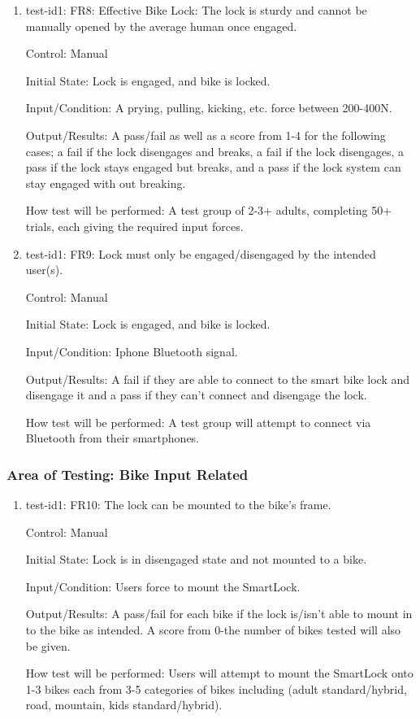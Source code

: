 \documentclass[12pt, titlepage]{article}
\begin{document}
\begin{enumerate}

\item{test-id1: FR8: Effective Bike Lock: The lock is sturdy and cannot be manually opened by the average human once engaged. \\}

Control: Manual

Initial State: Lock is engaged, and bike is locked.

Input/Condition: A prying, pulling, kicking, etc. force between 200-400N.

Output/Results: A pass/fail as well as a score from 1-4 for the following cases; a fail if the lock disengages and breaks, a fail if the lock disengages, a pass if the lock stays engaged but breaks, and a pass if the lock system can stay engaged with out breaking.

How test will be performed: A test group of 2-3+ adults, completing 50+ trials, each giving the required input forces.

\item{test-id1: FR9: Lock must only be engaged/disengaged by the intended user(s). \\}

Control: Manual

Initial State: Lock is engaged, and bike is locked.

Input/Condition: Iphone Bluetooth signal.

Output/Results: A fail if they are able to connect to the smart bike lock and disengage it and a pass if they can’t connect and disengage the lock.

How test will be performed: A test group will attempt to connect via Bluetooth from their smartphones.

\end{enumerate}

\subsubsection{Area of Testing: Bike Input Related}

\begin{enumerate}

\item{test-id1: FR10: The lock can be mounted to the bike’s frame. \\}

Control: Manual

Initial State: Lock is in disengaged state and not mounted to a bike.

Input/Condition: Users force to mount the SmartLock.

Output/Results: A pass/fail for each bike if the lock is/isn’t able to mount in to the bike as intended. A score from 0-the number of bikes tested will also be given.

How test will be performed: Users will attempt to mount the SmartLock onto 1-3 bikes each from 3-5 categories of bikes including (adult standard/hybrid, road, mountain, kids standard/hybrid).

\end{enumerate}
\end{document}
